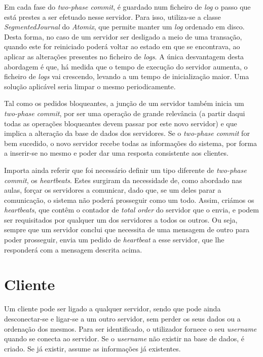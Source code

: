 \documentclass[a4paper]{report}
\begin{document}
		Em cada fase do \textit{two-phase commit}, é guardado num ficheiro de \textit{log} o passo que está prestes a ser efetuado nesse servidor. Para isso, utiliza-se a classe \textit{SegmentedJournal} do \textit{Atomix}, que permite manter um \textit{log} ordenado em disco. Desta forma, no caso de um servidor ser desligado a meio de uma transação, quando este for reiniciado poderá voltar ao estado em que se encontrava, ao aplicar as alterações presentes no ficheiro de \textit{logs}. A única desvantagem desta abordagem é que, há medida que o tempo de execução do servidor aumenta, o ficheiro de \textit{logs} vai crescendo, levando a um tempo de inicialização maior. Uma solução aplicável seria limpar o mesmo periodicamente.

		Tal como os pedidos bloqueantes, a junção de um servidor também inicia um \textit{two-phase commit}, por ser uma operação de grande relevância 
		(a partir daqui todas as operações bloqueantes devem passar por este novo servidor) e que implica a alteração da base de dados dos servidores.
		Se o \textit{two-phase commit} for bem sucedido, o novo servidor recebe todas as informações do sistema, por forma a inserir-se no mesmo e poder dar uma resposta consistente aos clientes.

		Importa ainda referir que foi necessário definir um tipo diferente de \textit{two-phase commit}, os \textit{heartbeats}. Estes surgiram da necessidade de, como abordado nas aulas, forçar os servidores a comunicar, dado que, se um deles parar a comunicação, o sistema não poderá prosseguir como um todo. Assim, criámos os \textit{heartbeats}, que contêm o contador de \textit{total order} do servidor que o envia, e podem ser requisitados por qualquer um dos servidores a todos os outros. Ou seja, sempre que um servidor conclui que necessita de uma mensagem de outro para poder prosseguir, envia um pedido de \textit{heartbeat} a esse servidor, que lhe responderá com a mensagem descrita acima.

	\section{Cliente}
		Um cliente pode ser ligado a qualquer servidor, sendo que pode ainda desconectar-se e ligar-se a um outro servidor, sem perder os seus dados ou a ordenação dos mesmos.
		Para ser identificado, o utilizador fornece o seu \textit{username} quando se conecta ao servidor. Se o \textit{username} não existir na base de dados, é criado. Se já existir, assume as informações já existentes.
\end{document}
